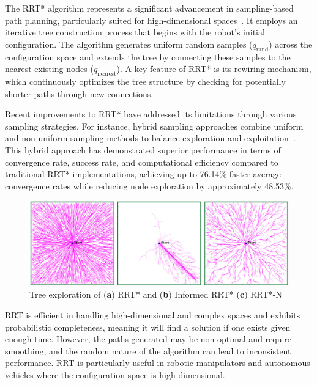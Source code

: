 \noindent The RRT* algorithm represents a significant advancement in sampling-based path planning, particularly suited for high-dimensional spaces~\cite{karaman2011sampling}. It employs an iterative tree construction process that begins with the robot's initial configuration. The algorithm generates uniform random samples ($q_{\text{rand}}$) across the configuration space and extends the tree by connecting these samples to the nearest existing nodes ($q_{\text{nearest}}$). A key feature of RRT* is its rewiring mechanism, which continuously optimizes the tree structure by checking for potentially shorter paths through new connections.

\noindent Recent improvements to RRT* have addressed its limitations through various sampling strategies. For instance, hybrid sampling approaches combine uniform and non-uniform sampling methods to balance exploration and exploitation~\cite{ganesan2024hybrid}. This hybrid approach has demonstrated superior performance in terms of convergence rate, success rate, and computational efficiency compared to traditional RRT* implementations, achieving up to 76.14\% faster average convergence rates while reducing node exploration by approximately 48.53\%.

\vspace{-0.08cm}

\begin{figure}[H]
    \centering
    \includegraphics[width=5.2in]{pics/rrt.png}
    \caption[Tree exploration of (\textbf{a}) RRT* and (\textbf{b}) RRT* Connect]{Tree exploration of (\textbf{a}) RRT* and (\textbf{b}) Informed RRT* (\textbf{c}) RRT*-N~\cite{ganesan2024hybrid}}\label{fig:rrt}
\end{figure}

\noindent RRT is efficient in handling high-dimensional and complex spaces and exhibits probabilistic completeness, meaning it will find a solution if one exists given enough time. However, the paths generated may be non-optimal and require smoothing, and the random nature of the algorithm can lead to inconsistent performance. RRT is particularly useful in robotic manipulators and autonomous vehicles where the configuration space is high-dimensional.

